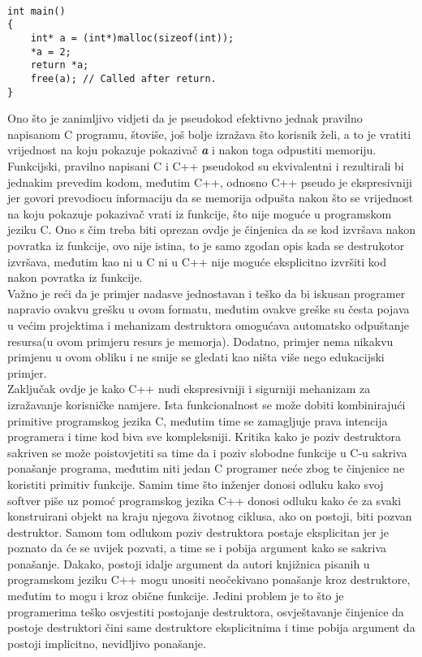 \begin{lstlisting}

int main()
{
    int* a = (int*)malloc(sizeof(int));
    *a = 2;
    return *a;
    free(a); // Called after return.
}
\end{lstlisting}
Ono što je zanimljivo vidjeti da je pseudokod efektivno jednak pravilno napisanom C programu, štoviše, još bolje izražava što korisnik želi, a to je vratiti vrijednost na koju pokazuje pokazivač \textbf{\textit{a}} i nakon toga odpustiti memoriju. Funkcijski, pravilno napisani C i C++ pseudokod su ekvivalentni i rezultirali bi jednakim prevedim kodom, međutim C++, odnosno C++ pseudo je ekspresivniji jer govori prevodiocu informaciju da se memorija odpušta nakon što se vrijednost na koju pokazuje pokazivač vrati iz funkcije, što nije moguće u programskom jeziku C. Ono s čim treba biti oprezan ovdje je činjenica da se kod izvršava nakon povratka iz funkcije, ovo nije istina, to je samo zgodan opis kada se destrukotor izvršava, međutim kao ni u C ni u C++ nije moguće eksplicitno izvršiti kod nakon povratka iz funkcije. \\
Važno je reći da je primjer nadasve jednostavan i teško da bi iskusan programer napravio ovakvu grešku u ovom formatu, međutim ovakve greške su česta pojava u većim projektima i mehanizam destruktora omogućava automatsko odpuštanje resursa(u ovom primjeru resurs je memorja). Dodatno, primjer nema nikakvu primjenu u ovom obliku i ne smije se gledati kao ništa više nego edukacijski primjer. \\
Zaključak ovdje je kako C++ nudi ekspresivniji i sigurniji mehanizam za izražavanje korisničke namjere. Ista funkcionalnost se može dobiti kombinirajući primitive programskog jezika C, međutim time se zamagljuje prava intencija programera i time kod biva sve kompleksniji. Kritika kako je poziv destruktora sakriven se može poistovjetiti sa time da i poziv slobodne funkcije u C-u sakriva ponašanje programa, međutim niti jedan C programer neće zbog te činjenice ne koristiti primitiv funkcije. Samim time što inženjer donosi odluku kako svoj softver piše uz pomoć programskog jezika C++ donosi odluku kako će za svaki konstruirani objekt na kraju njegova životnog ciklusa, ako on postoji, biti pozvan destruktor. Samom tom odlukom poziv destruktora postaje eksplicitan jer je poznato da će se uvijek pozvati, a time se i pobija argument kako se sakriva ponašanje. Dakako, postoji idalje argument da autori knjižnica pisanih u programskom jeziku C++ mogu unositi neočekivano ponašanje kroz destruktore, međutim to mogu i kroz obične funkcije. Jedini problem je to što je programerima teško osvjestiti postojanje destruktora, osvještavanje činjenice da postoje destruktori čini same destruktore eksplicitnima i time pobija argument da postoji implicitno, nevidljivo ponašanje. 

